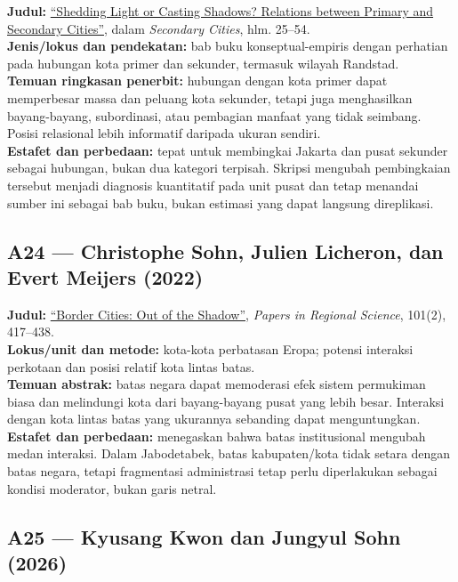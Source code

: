 \documentclass[
  indonesian,
  11pt,
  a4paper,
  oneside,
  openany]{report}
\begin{document}
\textbf{Judul:}
\href{https://doi.org/10.1332/policypress/9781529212075.003.0002}{``Shedding
Light or Casting Shadows? Relations between Primary and Secondary
Cities''}, dalam \emph{Secondary Cities}, hlm. 25--54.\\
\textbf{Jenis/lokus dan pendekatan:} bab buku konseptual-empiris dengan
perhatian pada hubungan kota primer dan sekunder, termasuk wilayah
Randstad.\\
\textbf{Temuan ringkasan penerbit:} hubungan dengan kota primer dapat
memperbesar massa dan peluang kota sekunder, tetapi juga menghasilkan
bayang-bayang, subordinasi, atau pembagian manfaat yang tidak seimbang.
Posisi relasional lebih informatif daripada ukuran sendiri.\\
\textbf{Estafet dan perbedaan:} tepat untuk membingkai Jakarta dan pusat
sekunder sebagai hubungan, bukan dua kategori terpisah. Skripsi mengubah
pembingkaian tersebut menjadi diagnosis kuantitatif pada unit pusat dan
tetap menandai sumber ini sebagai bab buku, bukan estimasi yang dapat
langsung direplikasi.

\subsection{A24 --- Christophe Sohn, Julien Licheron, dan Evert Meijers
(2022)}\label{a24-christophe-sohn-julien-licheron-dan-evert-meijers-2022}

\textbf{Judul:} \href{https://doi.org/10.1111/pirs.12653}{``Border
Cities: Out of the Shadow''}, \emph{Papers in Regional Science}, 101(2),
417--438.\\
\textbf{Lokus/unit dan metode:} kota-kota perbatasan Eropa; potensi
interaksi perkotaan dan posisi relatif kota lintas batas.\\
\textbf{Temuan abstrak:} batas negara dapat memoderasi efek sistem
permukiman biasa dan melindungi kota dari bayang-bayang pusat yang lebih
besar. Interaksi dengan kota lintas batas yang ukurannya sebanding dapat
menguntungkan.\\
\textbf{Estafet dan perbedaan:} menegaskan bahwa batas institusional
mengubah medan interaksi. Dalam Jabodetabek, batas kabupaten/kota tidak
setara dengan batas negara, tetapi fragmentasi administrasi tetap perlu
diperlakukan sebagai kondisi moderator, bukan garis netral.

\subsection{A25 --- Kyusang Kwon dan Jungyul Sohn
(2026)}\label{a25-kyusang-kwon-dan-jungyul-sohn-2026}
\end{document}
